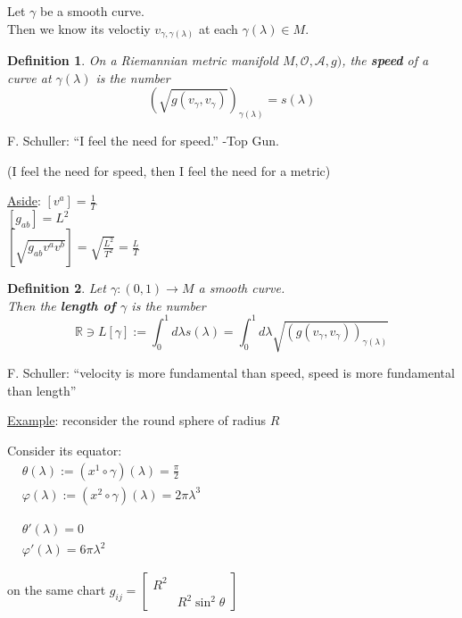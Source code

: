\documentclass[10pt, twoside]{amsart}
\newtheorem{definition}{Definition}
\begin{document}
\begin{multicols*}{2}
Let $\gamma$ be a smooth curve. \\
Then we know its veloctiy $v_{\gamma, \gamma(\lambda)}$ at each $\gamma(\lambda) \in M$.  

\begin{definition}
  On a Riemannian metric manifold $M, \mathcal{O},\mathcal{A},g)$, the \textbf{speed} of a curve at $\gamma(\lambda)$ is the number 
\[
(\sqrt{ g(v_{\gamma}, v_{\gamma}) })_{\gamma(\lambda)} = s(\lambda)
\]
\end{definition}

F. Schuller: ``I feel the need for speed.'' -Top Gun.  

(I feel the need for speed, then I feel the need for a metric)

\underline{Aside}: $[v^a] = \frac{1}{T}$ \\
\phantom{Aside:} $[g_{ab}] = L^2 $ \\
\phantom{Aside:} $[\sqrt{g_{ab}v^av^b}] = \sqrt{ \frac{L^2}{T^2}} = \frac{L}{T}$

\begin{definition}
  Let $\gamma:(0,1) \to M$ a smooth curve.  \\
Then the \textbf{length of $\gamma$} is the number 
\[
\mathbb{R} \ni L[\gamma] := \int_0^1 d\lambda s(\lambda) = \int_0^1 d\lambda \sqrt{ (g(v_{\gamma}, v_{\gamma}))_{\gamma(\lambda)}}
\]
\end{definition}

F. Schuller: ``velocity is more fundamental than speed, speed is more fundamental than length''

\underline{Example}: reconsider the round sphere of radius $R$

Consider its equator: \\
$\begin{aligned}
&  \theta(\lambda) := (x^1 \circ \gamma)(\lambda) = \frac{\pi}{2} \\ 
 & \varphi(\lambda) := (x^2 \circ \gamma)(\lambda) = 2\pi \lambda^3   
\end{aligned}$

$\begin{aligned}
  & \theta'(\lambda) = 0 \\
  & \varphi'(\lambda) = 6\pi\lambda^2 
\end{aligned}$

on the same chart $g_{ij} = \left[ \begin{matrix} R^2 & \\ 
    & R^2 \sin^2{\theta} \end{matrix} \right]$


\end{multicols*}
\end{document}
